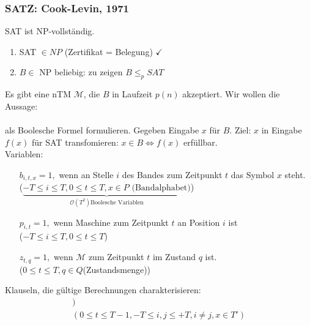 \subsubsection{SATZ: Cook-Levin, 1971}
SAT ist NP-vollständig.\\
\begin{enumerate}
\item SAT $\in NP$ (Zertifikat = Belegung) $\checkmark$
\item $B \in $ NP beliebig: zu zeigen $B \leq_p SAT$
\end{enumerate}
Es gibt eine nTM $\mathcal{M}$, die $B$ in Laufzeit $p(n)$ akzeptiert. Wir wollen die Aussage: \\
\\
als Boolesche Formel formulieren. Gegeben Eingabe $x$ für $B$. Ziel: $x$ in Eingabe $f(x)$ für SAT transfomieren: $x \in B \Leftrightarrow f(x)$ erfüllbar.\\
Variablen: 
\begin{enumerate}
\item[$b_{i,t,x} = 1,$ ] wenn an Stelle $i$ des Bandes zum Zeitpunkt $t$ das Symbol $x$ steht.\\ ($\underbrace{ -T \leq i \leq T, 0\leq t \leq T, x \in P \text{ (Bandalphabet)}}_{\mathcal{O}(T^2) \text{Boolesche Variablen}}$)
\item[$p_{i,t} = 1,$] wenn Maschine zum Zeitpunkt $t$ an Position $i$ ist\\
($-T \leq i \leq T, 0 \leq t \leq T$)
\item[$z_{t,q} = 1,$] wenn $\mathcal{M}$ zum Zeitpunkt $t$ im Zustand $q$ ist.\\
($0 \leq t \leq T, q \in Q$(Zustandsmenge))
\end{enumerate}
Klauseln, die gültige Berechnungen charakterisieren:
\begin{align*}
[p_{it} \Rightarrow (b_{j,t,x} \Leftrightarrow b_{j,t+1,x}])\\
(0 \leq t \leq T-1, -T \leq i, j \leq +T, i \neq j, x \in T')
\end{align*}
